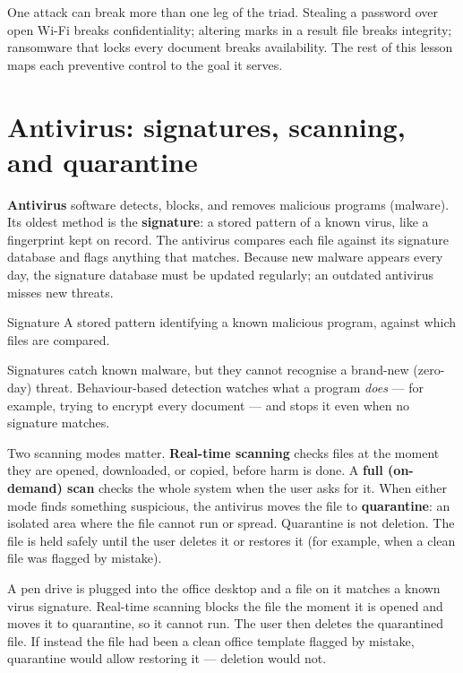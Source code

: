 One attack can break more than one leg of the triad. Stealing a password over
open Wi-Fi breaks confidentiality; altering marks in a result file breaks
integrity; ransomware that locks every document breaks availability. The rest
of this lesson maps each preventive control to the goal it serves.

\section{Antivirus: signatures, scanning, and quarantine}
\textbf{Antivirus} software detects, blocks, and removes malicious programs
(malware). Its oldest method is the \textbf{signature}: a stored pattern of a
known virus, like a fingerprint kept on record. The antivirus compares each
file against its signature database and flags anything that matches. Because
new malware appears every day, the signature database must be updated
regularly; an outdated antivirus misses new threats.

\begin{definitionbox}{Signature}
A stored pattern identifying a known malicious program, against which files
are compared.
\end{definitionbox}

Signatures catch known malware, but they cannot recognise a brand-new
(zero-day) threat. Behaviour-based detection watches what a program
\emph{does} --- for example, trying to encrypt every document --- and stops
it even when no signature matches.

Two scanning modes matter. \textbf{Real-time scanning} checks files at the
moment they are opened, downloaded, or copied, before harm is done. A
\textbf{full (on-demand) scan} checks the whole system when the user asks for
it. When either mode finds something suspicious, the antivirus moves the file
to \textbf{quarantine}: an isolated area where the file cannot run or spread.
Quarantine is not deletion. The file is held safely until the user deletes it
or restores it (for example, when a clean file was flagged by mistake).

\begin{example}
A pen drive is plugged into the office desktop and a file on it matches a
known virus signature. Real-time scanning blocks the file the moment it is
opened and moves it to quarantine, so it cannot run. The user then deletes the
quarantined file. If instead the file had been a clean office template flagged
by mistake, quarantine would allow restoring it --- deletion would not.
\end{example}

